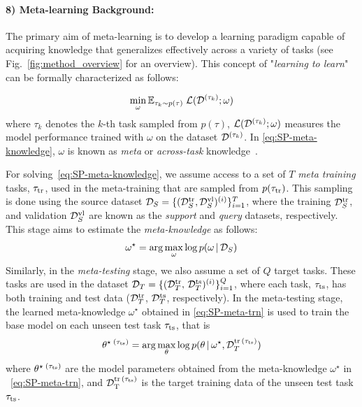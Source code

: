 \clearpage
\setcounter{page}{1}
\maketitlesupplementary


\paragraph{\bf \textbf{8) Meta-learning Background:}}

The primary aim of meta-learning is to develop a learning paradigm capable of acquiring knowledge that generalizes effectively across a variety of tasks (see Fig.~\ref{fig:method_overview} for an overview). This concept of "{\it learning to learn}" can be formally characterized as follows:

\begin{equation}
    \min_{\omega} 	
    \mathbb{E}_{{\tau}_k\sim p({\tau})}\; 
    {\cal L}({\cal D}^{(\tau_k)};\omega)\label{eq:SP-meta-knowledge}
\end{equation}
where ${\tau}_k$ denotes the $k$-th task sampled from $p(\tau)$, ${\cal L}({\cal D}^{(\tau_k)};\omega)$ measures the model performance trained  with $\omega$ on the dataset ${\cal D}^{(\tau_k)}$. In \cref{eq:SP-meta-knowledge},  $\omega$ is known as {\it meta} or {\it across-task} knowledge~\cite{hospedales2021meta}.

For solving~\cref{eq:SP-meta-knowledge}, we assume access to a set of $T$ {\it meta training} tasks, $\tau_{\rm tr}$, used in the meta-training that are sampled from $p({\tau_{\rm tr}})$. This sampling is done using the source dataset  ${\cal D}_{S}=\{ 
({\cal D}^{\rm tr}_{S},{\cal D}^{\rm vl}_{S})^{(i)}
\}_{i=1}^T$, where the training 
${\cal D}^{\rm tr}_{S}$, and validation 
${\cal D}^{\rm vl}_{S}$ are known 
as the {\it support} and {\it query} datasets, respectively. This stage aims to estimate the {\it meta-knowledge} as follows:
\begin{equation}
    \omega^{\star} = \arg\max_{\omega} \log p (\omega\,|\,{\cal  D}_{S}) \label{eq:SP-meta-trn}
\end{equation}
Similarly, in the {\it meta-testing} stage, we also assume a set of $Q$ target tasks. These tasks are used in the dataset ${\cal D}_{T} =
\{  
( {\cal D}^{\rm tr}_{T},\,{\cal D}^{\rm ts}_{T} )^{(i)} 
\}_{i=1}^Q$, where each task, $\tau_{\rm ts}$, has both training and test data (${\cal D}^{\rm tr}_{T}$, ${\cal D}^{\rm ts}_{T}$, respectively). In the meta-testing stage, the learned meta-knowledge $\omega^{\star}$ obtained in \cref{eq:SP-meta-trn} is used to train the base model on each  unseen test task $\tau_{\rm ts}$, that is 
\begin{equation}
    \theta^{{\star}\;(\tau_{\rm ts})} = \arg\max_{\theta} \log p (\theta\,|\, \omega^{\star}, {\cal D}_{T}^{{\rm tr}\,(\tau_{\rm ts})}) \label{eq:SM-meta-tst}
\end{equation}
where $\theta^{{\star}\;(\tau_{\rm ts})}$ are the model parameters obtained from the  meta-knowledge $\omega^{\star}$ in ~\cref{eq:SP-meta-trn}, and  ${\cal D}_{\rm T}^{{\rm tr}\,(\tau_{\rm ts})}$ is the target training data of the unseen test task $\tau_{\rm ts}$.

